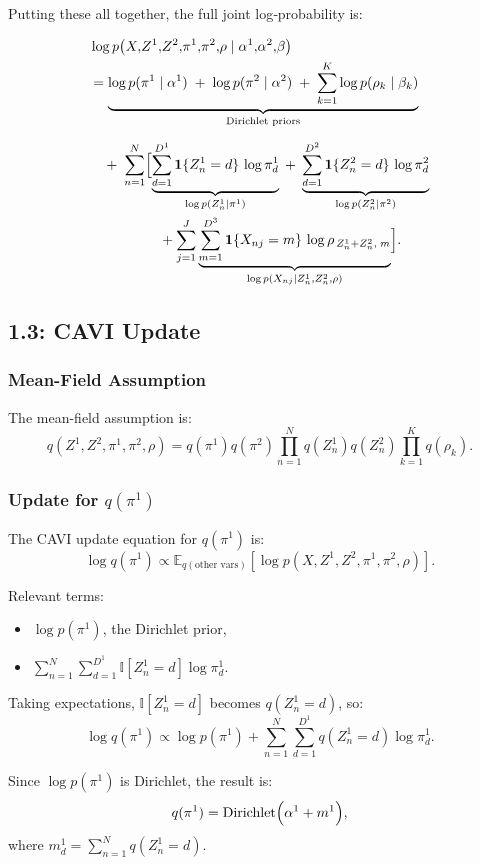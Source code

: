 \documentclass{article}
\begin{document}
\noindent
Putting these all together, the full joint log‐probability is:

\[
\begin{aligned}
&\log p\bigl(X,\!Z^1,\!Z^2,\!\pi^1,\!\pi^2,\!\rho 
    \mid \alpha^1,\!\alpha^2,\!\beta \bigr) \\
&=
\underbrace{\log p(\pi^1 \mid \alpha^1)
\;+\;
\log p(\pi^2 \mid \alpha^2)
\;+\;
\sum_{k=1}^K \log p(\rho_k \mid \beta_k)}_{\text{Dirichlet priors}}
\\[6pt]
&\quad
+\;
\sum_{n=1}^N 
\Bigl[
  \underbrace{\sum_{d=1}^{D^1} \mathbf{1}\{Z^1_n = d\}\,\log \pi^1_{d}}_{\log p(Z^1_n \mid \pi^1)}
  \;+\;
  \underbrace{\sum_{d=1}^{D^2} \mathbf{1}\{Z^2_n = d\}\,\log \pi^2_{d}}_{\log p(Z^2_n \mid \pi^2)}
\\
&\qquad\qquad\quad
  + \sum_{j=1}^J
    \underbrace{\sum_{m=1}^{D^3}
      \mathbf{1}\{X_{nj} = m\}\,\log \rho_{\,Z^1_n + Z^2_n,\;m}}_{\log p(X_{nj} \mid Z^1_n,Z^2_n,\rho)}
\Bigr].
\end{aligned}
\]
\subsection{1.3: CAVI Update}
\subsubsection*{Mean-Field Assumption}
The mean-field assumption is:
\[
q(Z^1, Z^2, \pi^1, \pi^2, \rho) = q(\pi^1)q(\pi^2)\prod_{n=1}^N q(Z_n^1)q(Z_n^2)\prod_{k=1}^K q(\rho_k).
\]

\subsubsection*{Update for \(q(\pi^1)\)}
The CAVI update equation for \(q(\pi^1)\) is:
\[
\log q(\pi^1) \propto \mathbb{E}_{q(\text{other vars})}[\log p(X, Z^1, Z^2, \pi^1, \pi^2, \rho)].
\]

Relevant terms:
\begin{itemize}
    \item \(\log p(\pi^1)\), the Dirichlet prior,
    \item \(\sum_{n=1}^N \sum_{d=1}^{D^1} \mathbb{I}[Z_n^1 = d]\log \pi^1_d\).
\end{itemize}

Taking expectations, \(\mathbb{I}[Z_n^1 = d]\) becomes \(q(Z_n^1 = d)\), so:
\[
\log q(\pi^1) \propto \log p(\pi^1) + \sum_{n=1}^N \sum_{d=1}^{D^1} q(Z_n^1 = d)\log \pi^1_d.
\]

Since \(\log p(\pi^1)\) is Dirichlet, the result is:
\[
q(\pi^1) = \mathrm{Dirichlet}\Bigl(\alpha^1 + m^1\Bigr),
\]
where \(m^1_d = \sum_{n=1}^N q(Z_n^1 = d)\).
\end{document}
